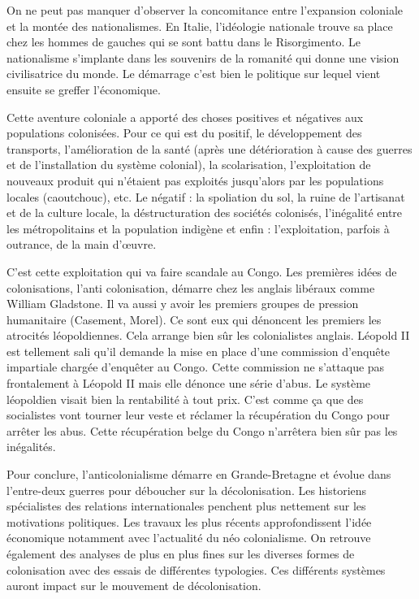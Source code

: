 \documentclass[12pt]{report}
\begin{document}
On ne peut pas manquer d’observer la concomitance entre l’expansion coloniale et la montée
des nationalismes. En Italie, l’idéologie nationale trouve sa place chez les hommes de gauches
qui se sont battu dans le Risorgimento. Le nationalisme s’implante dans les souvenirs de la
romanité qui donne une vision civilisatrice du monde. Le démarrage c’est bien le politique
sur lequel vient ensuite se greffer l’économique.

Cette aventure coloniale a apporté des choses positives et négatives aux populations
colonisées.
Pour ce qui est du positif, le développement des transports, l’amélioration de la santé (après une
détérioration à cause des guerres et de l’installation du système colonial), la
scolarisation, l’exploitation de nouveaux produit qui n'étaient pas exploités jusqu'alors par les populations locales (caoutchouc), etc.
Le négatif : la spoliation du sol, la ruine de l’artisanat et de la culture locale, la déstructuration des
sociétés colonisés, l’inégalité entre les métropolitains et la population indigène et
enfin : l’exploitation, parfois à outrance, de la main d’œuvre.

C’est cette exploitation qui va faire scandale au Congo. Les premières idées de colonisations,
l’anti colonisation, démarre chez les anglais libéraux comme William Gladstone. Il va aussi y
avoir les premiers groupes de pression humanitaire (Casement, Morel). Ce sont eux qui
dénoncent les premiers les atrocités léopoldiennes. Cela arrange bien sûr les colonialistes
anglais. Léopold II est tellement sali qu’il demande la mise en place d’une commission
d’enquête impartiale chargée d’enquêter au Congo. Cette commission ne s’attaque pas
frontalement à Léopold II mais elle dénonce une série d’abus. Le système léopoldien visait
bien la rentabilité à tout prix. C’est comme ça que des socialistes vont tourner leur veste et
réclamer la récupération du Congo pour arrêter les abus. Cette récupération belge du Congo
n’arrêtera bien sûr pas les inégalités.

Pour conclure, l’anticolonialisme démarre en Grande-Bretagne et évolue dans l’entre-deux
guerres pour déboucher sur la décolonisation. Les historiens spécialistes des relations
internationales penchent plus nettement sur les motivations politiques. Les travaux les plus
récents approfondissent l’idée économique notamment avec l’actualité du néo colonialisme.
On retrouve également des analyses de plus en plus fines sur les diverses formes de
colonisation avec des essais de différentes typologies. Ces différents systèmes auront impact
sur le mouvement de décolonisation.
\end{document}
